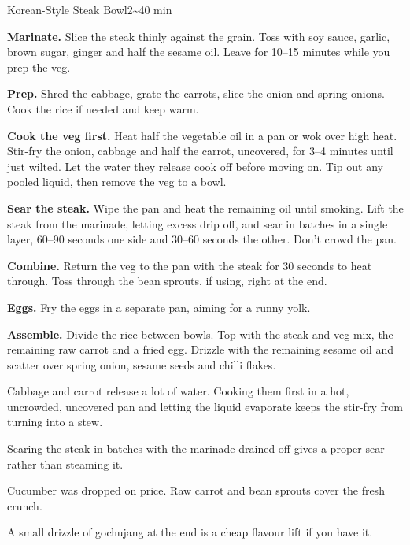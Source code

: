 \begin{recipebox}{Korean-Style Steak Bowl}{2}{\textasciitilde40 min}
\begin{method}
  \item \textbf{Marinate.} Slice the steak thinly against the grain. Toss with soy
        sauce, garlic, brown sugar, ginger and half the sesame oil. Leave for 10--15 minutes
        while you prep the veg.
  \item \textbf{Prep.} Shred the cabbage, grate the carrots, slice the onion and
        spring onions. Cook the rice if needed and keep warm.
  \item \textbf{Cook the veg first.} Heat half the vegetable oil in a pan or wok over
        high heat. Stir-fry the onion, cabbage and half the carrot, uncovered, for 3--4
        minutes until just wilted. Let the water they release cook off before moving on.
        Tip out any pooled liquid, then remove the veg to a bowl.
  \item \textbf{Sear the steak.} Wipe the pan and heat the remaining oil until
        smoking. Lift the steak from the marinade, letting excess drip off, and sear in
        batches in a single layer, 60--90 seconds one side and 30--60 seconds the other.
        Don't crowd the pan.
  \item \textbf{Combine.} Return the veg to the pan with the steak for 30 seconds to
        heat through. Toss through the bean sprouts, if using, right at the end.
  \item \textbf{Eggs.} Fry the eggs in a separate pan, aiming for a runny yolk.
  \item \textbf{Assemble.} Divide the rice between bowls. Top with the steak and veg
        mix, the remaining raw carrot and a fried egg. Drizzle with the remaining sesame
        oil and scatter over spring onion, sesame seeds and chilli flakes.
\end{method}

\begin{notelist}
  \item Cabbage and carrot release a lot of water. Cooking them first in a hot,
        uncrowded, uncovered pan and letting the liquid evaporate keeps the stir-fry from
        turning into a stew.
  \item Searing the steak in batches with the marinade drained off gives a proper
        sear rather than steaming it.
  \item Cucumber was dropped on price. Raw carrot and bean sprouts cover the fresh
        crunch.
  \item A small drizzle of gochujang at the end is a cheap flavour lift if you have it.
\end{notelist}

\end{recipebox}
